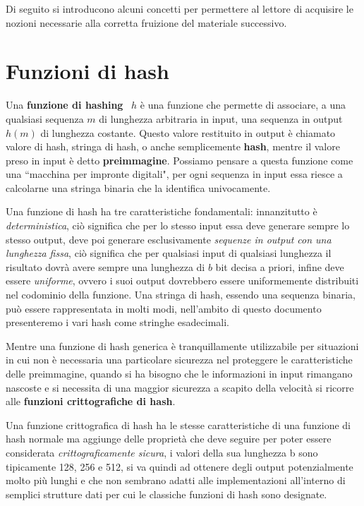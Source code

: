 Di seguito si introducono alcuni concetti 
per permettere al lettore di acquisire le nozioni necessarie alla
corretta fruizione del materiale successivo.

\section{Funzioni di hash}
\label{sub:hash}
Una \textbf{funzione di hashing}~\cite{hash} \(h\) è una funzione che permette di associare,
a una qualsiasi sequenza \(m\) di lunghezza arbitraria in input, una sequenza
in output \(h(m)\) di lunghezza costante. 
Questo valore restituito in output è chiamato valore di hash, stringa di hash,
o anche semplicemente \textbf{hash}, mentre il valore preso in input è detto
\textbf{preimmagine}. Possiamo pensare a questa funzione come una ``macchina per
impronte digitali", per ogni sequenza in input essa riesce a calcolarne una stringa binaria
che la identifica univocamente.

Una funzione di hash ha tre caratteristiche fondamentali:
innanzitutto è \emph{deterministica}, ciò significa che per lo stesso input essa deve
generare sempre lo stesso output, deve poi generare esclusivamente
\emph{sequenze in output con una lunghezza fissa}, ciò significa che per qualsiasi input
di qualsiasi lunghezza il risultato dovrà avere sempre una lunghezza di \(b\) bit decisa
a priori, infine deve essere \emph{uniforme}, ovvero i suoi output dovrebbero essere
uniformemente distribuiti nel codominio della funzione.
Una stringa di hash, essendo una sequenza binaria, può essere rappresentata in molti modi,
nell'ambito di questo documento presenteremo i vari hash come stringhe esadecimali.

Mentre una funzione di hash generica è tranquillamente utilizzabile per situazioni
in cui non è necessaria una particolare sicurezza nel proteggere le caratteristiche
delle preimmagine, quando si ha bisogno che le
informazioni in input rimangano nascoste e si necessita di una maggior sicurezza a scapito
della velocità si ricorre alle \textbf{funzioni crittografiche di hash}.

Una funzione crittografica di hash ha le stesse caratteristiche di una funzione di
hash normale ma aggiunge delle proprietà che deve seguire per poter essere considerata
\emph{crittograficamente sicura}, i valori della sua lunghezza b sono tipicamente
128, 256 e 512, si va quindi ad ottenere degli output potenzialmente molto più lunghi
e che non sembrano adatti alle implementazioni all'interno di semplici strutture dati
per cui le classiche funzioni di hash sono designate.

